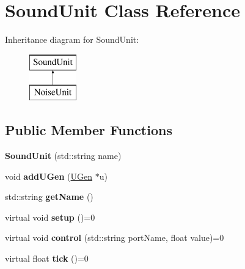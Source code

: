 \hypertarget{classSoundUnit}{}\section{Sound\+Unit Class Reference}
\label{classSoundUnit}
Inheritance diagram for Sound\+Unit\+:\begin{figure}[H]
\begin{center}
\leavevmode
\includegraphics[height=2.000000cm]{classSoundUnit}
\end{center}
\end{figure}
\subsection*{Public Member Functions}
\begin{DoxyCompactItemize}
\item 
{\bfseries Sound\+Unit} (std\+::string name)\hypertarget{classSoundUnit_a3220665fe1e433d1b0d90fa328e71133}{}\label{classSoundUnit_a3220665fe1e433d1b0d90fa328e71133}

\item 
void {\bfseries add\+U\+Gen} (\hyperlink{classUGen}{U\+Gen} $\ast$u)\hypertarget{classSoundUnit_ab88bf7e7dfb77cf7e18587fd5a637755}{}\label{classSoundUnit_ab88bf7e7dfb77cf7e18587fd5a637755}

\item 
std\+::string {\bfseries get\+Name} ()\hypertarget{classSoundUnit_a4854dfb9b839ff33d061ed013fbf3ef9}{}\label{classSoundUnit_a4854dfb9b839ff33d061ed013fbf3ef9}

\item 
virtual void {\bfseries setup} ()=0\hypertarget{classSoundUnit_aedfa9b99f4555ed5df4ceffe001c1e63}{}\label{classSoundUnit_aedfa9b99f4555ed5df4ceffe001c1e63}

\item 
virtual void {\bfseries control} (std\+::string port\+Name, float value)=0\hypertarget{classSoundUnit_a0a74ef3d6c9343f1ee64a9a96bdbbe78}{}\label{classSoundUnit_a0a74ef3d6c9343f1ee64a9a96bdbbe78}

\item 
virtual float {\bfseries tick} ()=0\hypertarget{classSoundUnit_af1f6ccffb8d1919bd774b340c01bea68}{}\label{classSoundUnit_af1f6ccffb8d1919bd774b340c01bea68}

\end{DoxyCompactItemize}
